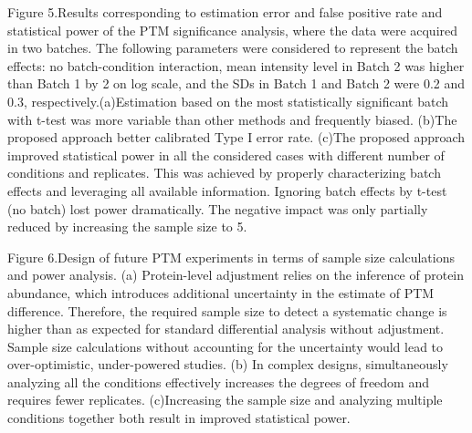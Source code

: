 \documentclass[mcp]{article}
\numberwithin{figure}{section} %
\numberwithin{table}{section}
\begin{document}
Figure 5.Results corresponding to estimation error and false positive rate and statistical power of the PTM significance analysis, where the data were acquired in two batches. The following parameters were considered to represent the batch effects: no batch-condition interaction, mean intensity level in Batch 2 was higher than Batch 1 by 2 on log scale, and the SDs in Batch 1 and Batch 2 were 0.2 and 0.3, respectively.(a)Estimation based on the most statistically significant batch with t-test was more variable than other methods and frequently biased. (b)The proposed approach better calibrated Type I error rate. (c)The proposed approach improved statistical power in all the considered cases with different number of conditions and replicates. This was achieved by properly characterizing batch effects and leveraging all available information. Ignoring batch effects by t-test (no batch) lost power dramatically. The negative impact was only partially reduced by increasing the sample size to 5.

Figure 6.Design of future PTM experiments in terms of sample size calculations and power analysis. (a) Protein-level adjustment relies on the inference of protein abundance, which introduces additional uncertainty in the estimate of PTM difference. Therefore, the required sample size to detect a systematic change is higher than as expected for standard differential analysis without adjustment. Sample size calculations without accounting for the uncertainty would lead to over-optimistic, under-powered studies. (b) In complex designs, simultaneously analyzing all the conditions effectively increases the degrees of freedom and requires fewer replicates. (c)Increasing the sample size and analyzing multiple conditions together both result in improved statistical power.



\printbibliography
\end{document}

